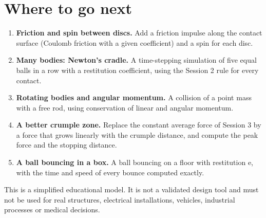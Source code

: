 \documentclass[11pt,a4paper]{article}
\begin{document}
\section*{Where to go next}
\begin{enumerate}[nosep]
\item \textbf{Friction and spin between discs.} Add a friction impulse along the contact surface (Coulomb friction with a given coefficient) and a spin for each disc.
\item \textbf{Many bodies: Newton's cradle.} A time-stepping simulation of five equal balls in a row with a restitution coefficient, using the Session 2 rule for every contact.
\item \textbf{Rotating bodies and angular momentum.} A collision of a point mass with a free rod, using conservation of linear and angular momentum.
\item \textbf{A better crumple zone.} Replace the constant average force of Session 3 by a force that grows linearly with the crumple distance, and compute the peak force and the stopping distance.
\item \textbf{A ball bouncing in a box.} A ball bouncing on a floor with restitution e, with the time and speed of every bounce computed exactly.
\end{enumerate}

This is a simplified educational model. It is not a validated design tool and must not be used for real structures, electrical installations, vehicles, industrial processes or medical decisions.
\end{document}
